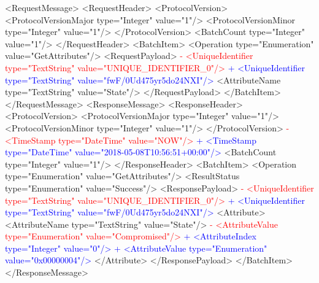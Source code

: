  \newpage
 <RequestMessage>
   <RequestHeader>
     <ProtocolVersion>
       <ProtocolVersionMajor type="Integer" value="1"/>
       <ProtocolVersionMinor type="Integer" value="1"/>
     </ProtocolVersion>
     <BatchCount type="Integer" value="1"/>
   </RequestHeader>
   <BatchItem>
     <Operation type="Enumeration" value="GetAttributes"/>
     <RequestPayload>
\textcolor{red}{-      <UniqueIdentifier type="TextString" value="UNIQUE_IDENTIFIER_0"/>}
\textcolor{blue}{+      <UniqueIdentifier type="TextString" value="fwF/0Ud475yr5do24NXI"/>}
       <AttributeName type="TextString" value="State"/>
     </RequestPayload>
   </BatchItem>
 </RequestMessage>
 <ResponseMessage>
   <ResponseHeader>
     <ProtocolVersion>
       <ProtocolVersionMajor type="Integer" value="1"/>
       <ProtocolVersionMinor type="Integer" value="1"/>
     </ProtocolVersion>
\textcolor{red}{-    <TimeStamp type="DateTime" value="NOW"/>}
\textcolor{blue}{+    <TimeStamp type="DateTime" value="2018-05-08T10:56:51+00:00"/>}
     <BatchCount type="Integer" value="1"/>
   </ResponseHeader>
   <BatchItem>
     <Operation type="Enumeration" value="GetAttributes"/>
     <ResultStatus type="Enumeration" value="Success"/>
     <ResponsePayload>
\textcolor{red}{-      <UniqueIdentifier type="TextString" value="UNIQUE_IDENTIFIER_0"/>}
\textcolor{blue}{+      <UniqueIdentifier type="TextString" value="fwF/0Ud475yr5do24NXI"/>}
       <Attribute>
         <AttributeName type="TextString" value="State"/>
\textcolor{red}{-        <AttributeValue type="Enumeration" value="Compromised"/>}
\textcolor{blue}{+        <AttributeIndex type="Integer" value="0"/>}
\textcolor{blue}{+        <AttributeValue type="Enumeration" value="0x00000004"/>}
       </Attribute>
     </ResponsePayload>
   </BatchItem>
 </ResponseMessage>
 
